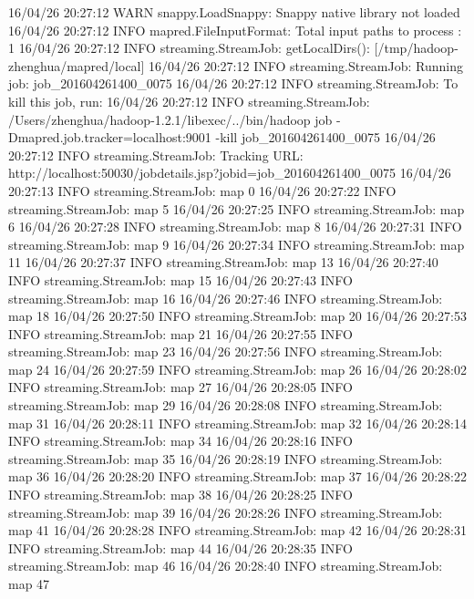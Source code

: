 16/04/26 20:27:12 WARN snappy.LoadSnappy: Snappy native library not loaded
16/04/26 20:27:12 INFO mapred.FileInputFormat: Total input paths to process : 1
16/04/26 20:27:12 INFO streaming.StreamJob: getLocalDirs(): [/tmp/hadoop-zhenghua/mapred/local]
16/04/26 20:27:12 INFO streaming.StreamJob: Running job: job_201604261400_0075
16/04/26 20:27:12 INFO streaming.StreamJob: To kill this job, run:
16/04/26 20:27:12 INFO streaming.StreamJob: /Users/zhenghua/hadoop-1.2.1/libexec/../bin/hadoop job  -Dmapred.job.tracker=localhost:9001 -kill job_201604261400_0075
16/04/26 20:27:12 INFO streaming.StreamJob: Tracking URL: http://localhost:50030/jobdetails.jsp?jobid=job_201604261400_0075
16/04/26 20:27:13 INFO streaming.StreamJob:  map 0%
16/04/26 20:27:22 INFO streaming.StreamJob:  map 5%
16/04/26 20:27:25 INFO streaming.StreamJob:  map 6%
16/04/26 20:27:28 INFO streaming.StreamJob:  map 8%
16/04/26 20:27:31 INFO streaming.StreamJob:  map 9%
16/04/26 20:27:34 INFO streaming.StreamJob:  map 11%
16/04/26 20:27:37 INFO streaming.StreamJob:  map 13%
16/04/26 20:27:40 INFO streaming.StreamJob:  map 15%
16/04/26 20:27:43 INFO streaming.StreamJob:  map 16%
16/04/26 20:27:46 INFO streaming.StreamJob:  map 18%
16/04/26 20:27:50 INFO streaming.StreamJob:  map 20%
16/04/26 20:27:53 INFO streaming.StreamJob:  map 21%
16/04/26 20:27:55 INFO streaming.StreamJob:  map 23%
16/04/26 20:27:56 INFO streaming.StreamJob:  map 24%
16/04/26 20:27:59 INFO streaming.StreamJob:  map 26%
16/04/26 20:28:02 INFO streaming.StreamJob:  map 27%
16/04/26 20:28:05 INFO streaming.StreamJob:  map 29%
16/04/26 20:28:08 INFO streaming.StreamJob:  map 31%
16/04/26 20:28:11 INFO streaming.StreamJob:  map 32%
16/04/26 20:28:14 INFO streaming.StreamJob:  map 34%
16/04/26 20:28:16 INFO streaming.StreamJob:  map 35%
16/04/26 20:28:19 INFO streaming.StreamJob:  map 36%
16/04/26 20:28:20 INFO streaming.StreamJob:  map 37%
16/04/26 20:28:22 INFO streaming.StreamJob:  map 38%
16/04/26 20:28:25 INFO streaming.StreamJob:  map 39%
16/04/26 20:28:26 INFO streaming.StreamJob:  map 41%
16/04/26 20:28:28 INFO streaming.StreamJob:  map 42%
16/04/26 20:28:31 INFO streaming.StreamJob:  map 44%
16/04/26 20:28:35 INFO streaming.StreamJob:  map 46%
16/04/26 20:28:40 INFO streaming.StreamJob:  map 47%
